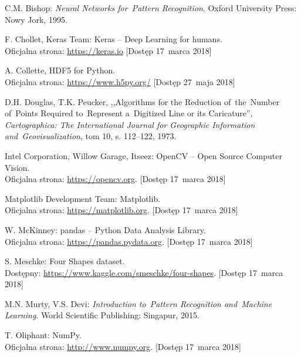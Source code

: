 \documentclass[11pt,a4paper]{article}
\begin{document}
\begin{thebibliography}{99}

        C.M. Bishop:
        \emph{Neural Networks for~Pattern Recognition}.
        Oxford University Press:
        Nowy Jork,
        1995.

        F. Chollet, Keras Team:
        Keras -- Deep Learning for humans. \\
        Oficjalna strona: \url{https://keras.io}
        [Dostęp 17~marca 2018]

        A. Collette,
        HDF5 for Python. \\
        Oficjalna strona: \url{https://www.h5py.org/}
        [Dostęp 27~maja 2018]
        
        D.H. Douglas,
        T.K. Peucker,
        ,,Algorithms for the Reduction of~the~Number of~Points Required to~Represent a~Digitized Line or its Caricature'',
        \emph{Cartographica: The International Journal for Geographic Information and~Geovisualization},
        tom 10,
        s. 112--122,
        1973.

        Intel Corporation, Willow Garage, Itseez:
        OpenCV -- Open Source Computer Vision. \\
        Oficjalna strona: \url{https://opencv.org}.
        [Dostęp 17~marca 2018]

        Matplotlib Development Team:
        Matplotlib. \\
        Oficjalna strona: \url{https://matplotlib.org}.
        [Dostęp 17~marca 2018]

        W. McKinney:
        pandas -- Python Data Analysis Library. \\
        Oficjalna strona: \url{https://pandas.pydata.org}.
        [Dostęp 17~marca 2018]

        S. Meschke:
        Four Shapes dataset. \\
        Dostępny: \url{https://www.kaggle.com/smeschke/four-shapes}.
        [Dostęp 17~marca 2018]

        M.N. Murty,
        V.S. Devi:
        \emph{Introduction to~Pattern Recognition and~Machine Learning}.
        World Scientific Publishing:
        Singapur,
        2015.

        T. Oliphant:
        NumPy. \\
        Oficjalna strona: \url{http://www.numpy.org}.
        [Dostęp 17~marca 2018]
        

\end{thebibliography}
\end{document}
